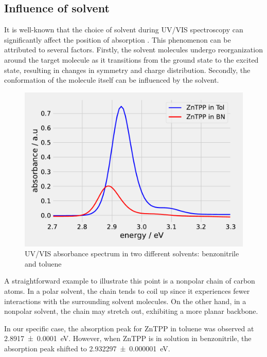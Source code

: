 \subsection{Influence of solvent}

It is well-known that the choice of solvent during UV/VIS spectroscopy can significantly affect the position of absorption \cite{Parson.2015}. This phenomenon can be attributed to several factors. Firstly, the solvent molecules undergo reorganization around the target molecule as it transitions from the ground state to the excited state, resulting in changes in symmetry and charge distribution. Secondly, the conformation of the molecule itself can be influenced by the solvent.
\begin{figure}[h]
    \centering
    \includegraphics[width = 13cm]{Program/ZnTPPinBNTol.pdf}
    \caption{UV/VIS absorbance spectrum in two different solvents: benzonitrile and toluene}
    \label{fig:ZnTTPdiffrentSolvents}
\end{figure}
A straightforward example to illustrate this point is a nonpolar chain of carbon atoms. In a polar solvent, the chain tends to coil up since it experiences fewer interactions with the surrounding solvent molecules. On the other hand, in a nonpolar solvent, the chain may stretch out, exhibiting a more planar backbone.

In our specific case, the absorption peak for ZnTPP in toluene was observed at \SI{2.8917 \pm 0.0001}{\eV}. However, when ZnTPP  is in solution in benzonitrile, the absorption peak shifted to \SI{2.932297\pm0.000001}{\eV}.

